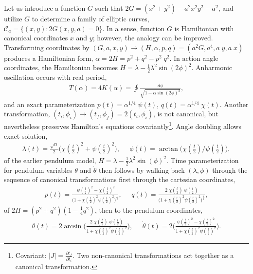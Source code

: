 \documentclass[nofootinbib,preprint]{revtex4-1}
\begin{document}
Let us introduce a function $G$ such that $2G=(x^2+y^2)-a^2 x^2 y^2-a^2$,
and utilize $G$ to determine a family of elliptic curves, 
$\mathcal{C}_a=\{(x,y):2G(x,y,a)=0\}$. In a sense, function $G$ is Hamiltonian 
with canonical coordinates $x$ and $y$; however, the analogy can be improved. 
Transforming coordinates by  $(G,a,x,y) \rightarrow (H,\alpha,p,q)=(a^2 G,a^4,a\;y,a\;x)$ 
produces a Hamiltonian form, $\alpha=2H=p^2+q^2 - p^2 \; q^2$. In action angle 
coordinates, the Hamiltonian becomes $H = \lambda-\frac{1}{2}\lambda^2\sin(2\phi)^2$. 
Anharmonic oscillation occurs with real period, 
\begin{eqnarray}
T(\alpha) = 4K(\alpha) = \oint \frac{d\phi}{\sqrt{1-\alpha\sin(2\phi)^2}},\nonumber
\end{eqnarray}
and an exact parameterization $p(t)=\alpha^{1/4} \;\psi(t)$, $q(t)=\alpha^{1/4} \;\chi(t)$. 
Another transformation, $(t_i,\phi_i)\rightarrow (t_f,\phi_f)=2(t_i,\phi_i)$, is not
canonical, but nevertheless preserves Hamilton's equations  covariantly\footnote{Covariant: 
$|J|=\frac{\partial t_f}{\partial t_i}$. Two non-canonical transformations act together as 
a canonical transformation.}. Angle doubling allows exact solution, 
\begin{eqnarray}
\lambda(t) = \frac{\sqrt{\alpha}}{2}\Big(\chi(\tfrac{t}{2})^2 + \psi(\tfrac{t}{2})^2\Big), \;\;\;\;\; 
\phi(t)   =  \arctan\big(\chi(\tfrac{t}{2})/\psi(\tfrac{t}{2})\big),  \nonumber 
\end{eqnarray}
of the earlier pendulum model, $H = \lambda-\frac{1}{2}\lambda^2\sin(\phi)^2$.
Time parameterization for pendulum variables $\theta$ and $\dot{\theta}$ then follows by 
walking back $(\lambda,\phi)$ through the sequence of canonical transformations\textemdash 
first through the cartesian coordinates,
\begin{eqnarray}
p(t)   =  \frac{ \; \psi(\tfrac{t}{2})^2-\chi(\tfrac{t}{2})^2 
}{\Big(1+\chi(\tfrac{t}{2})^2  \psi(\tfrac{t}{2})^2\Big)^{\frac{1}{2}}},  \;\;\;\;\; 
q(t)  = \frac{2 \;  \chi(\tfrac{t}{2})\;\psi(\tfrac{t}{2}) 
}{\Big(1+\chi(\tfrac{t}{2})^2 \psi(\tfrac{t}{2})^2\Big)^{\frac{1}{2}}}, \nonumber 
\end{eqnarray}
of $2H=(p^2+q^2)(1-\frac{1}{4}q^2)$, then to the pendulum coordinates,
\begin{eqnarray}
\theta(t) = 2 \arcsin\bigg(\frac{2\;\chi(\tfrac{t}{2})\; \psi(\tfrac{t}{2})
}{1+\chi(\tfrac{t}{2})^2 \psi(\tfrac{t}{2})^2 }\bigg), \;\;\;\;\; 
\dot{\theta}(t) = 2\bigg(\frac{\psi(\tfrac{t}{2})^2 - \chi(\tfrac{t}{2})^2
}{1+\chi(\tfrac{t}{2})^2 \psi(\tfrac{t}{2})^2 }\bigg). \nonumber 
\end{eqnarray}
\end{document}
